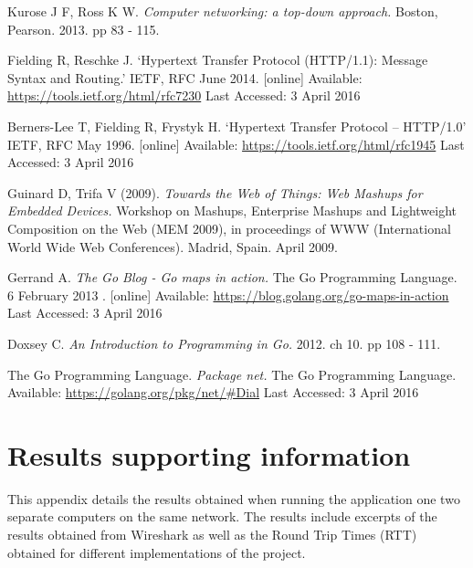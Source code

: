 \documentclass[10pt,twocolumn]{witseiepaper}
\begin{document}

\begin{thebibliography}{1}

 Kurose J F, Ross K W. \emph{Computer networking: a top-down approach.} Boston, Pearson. 2013. pp 83 - 115.

 Fielding R, Reschke J. `Hypertext Transfer Protocol (HTTP/1.1): Message Syntax and Routing.' IETF, RFC June 2014. [online] Available: \url{https://tools.ietf.org/html/rfc7230} Last Accessed: 3 April 2016

 Berners-Lee T, Fielding R, Frystyk H. `Hypertext Transfer Protocol -- HTTP/1.0' IETF, RFC May 1996. [online] Available: \url{https://tools.ietf.org/html/rfc1945} Last Accessed: 3 April 2016

   Guinard D, Trifa V (2009). \emph{Towards the Web of Things: Web Mashups for Embedded Devices.} Workshop on Mashups, Enterprise Mashups and Lightweight Composition on the Web (MEM 2009), in proceedings of WWW (International World Wide Web Conferences). Madrid, Spain. April 2009.  

 Gerrand A. \emph{The Go Blog - Go maps in action.} The Go Programming Language. 6 February 2013 . [online] Available: \url{https://blog.golang.org/go-maps-in-action} Last Accessed: 3 April 2016

 Doxsey C. \emph{An Introduction to Programming in Go.} 2012. ch 10. pp 108 - 111.

 The Go Programming Language. \emph{Package net.} The Go Programming Language. Available: \url{https://golang.org/pkg/net/#Dial} Last Accessed: 3 April 2016


\end{thebibliography}

\onecolumn
\clearpage
\newpage
\appendix
\section{Results supporting information} %
\label{sec:results}
	
	This appendix details the results obtained when running the application one two separate computers on the same network. The results include excerpts of the results obtained from Wireshark as well as the Round Trip Times (RTT) obtained for different implementations of the project.
\end{document}
